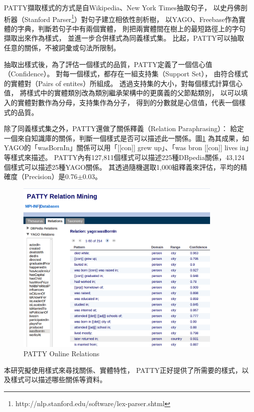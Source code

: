 PATTY擷取樣式的方式是自Wikipedia、New York Times抽取句子，
以史丹佛剖析器（Stanford Parser\footnote{http://nlp.stanford.edu/software/lex-parser.shtml}）對句子建立相依性剖析樹，
以YAGO、Freebase作為實體的字典，判斷若句子中有兩個實體，
則把兩實體間在樹上的最短路徑上的字句擷取出來作為樣式，
並進一步合併樣式為同義樣式集。
比起\cite{reverb}，PATTY可以抽取任意的關係，不被詞彙或句法所限制。

抽取出樣式後，為了評估一個樣式的品質，PATTY定義了一個信心值（Confidence）。
對每一個樣式，都存在一組支持集（Support Set），
由符合樣式的實體對（Pairs of entites）所組成。
透過支持集的大小，對每個樣式計算信心值，
將樣式中的實體類別改為類別繼承架構中的更廣義的父節點類別，
以可以填入的實體對數作為分母，支持集作為分子，
得到的分數就是心信值，代表一個樣式的品質。

除了同義樣式集之外，PATTY還做了關係釋義（Relation Paraphrasing）：
給定一個來自知識庫的關係，判斷一個樣式是否可以描述此一關係。圖\ref{i:patty-online} 為其成果，如YAGO的「wasBornIn」關係可以用「[[con]] grew up」、「was bron [[con]] lives in」等樣式來描述。
PATTY內有127,811個樣式可以描述225種DBpedia關係，43,124個樣式可以描述25種YAGO關係。
其透過隨機選取1,000組釋義來評估，平均的精確度（Precision）是0.76$\pm$0.03。

\begin{figure}
    \centering
    \includegraphics[width=0.9\textwidth]{images/02-patty-online}
    \caption{PATTY Online Relations}
    \label{i:patty-online}
\end{figure}

本研究擬使用樣式來尋找關係、實體特性，
PATTY正好提供了所需要的樣式，以及樣式可以描述哪些關係等資料。

